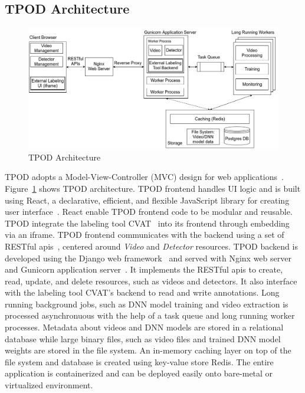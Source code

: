 \subsection{TPOD Architecture}

\begin{figure}[]
  \hspace{-.1in}
    \includegraphics[width=1.1\textwidth]{FIGS/tpod-arch}
    \caption{TPOD Architecture}
  \label{figs:tpod-arch}
\end{figure}

TPOD adopts a Model-View-Controller (MVC) design for web
applications~\cite{krasner1988description}. Figure~\ref{figs:tpod-arch} shows
TPOD architecture. TPOD frontend handles UI logic and is built using React, a
declarative, efficient, and flexible JavaScript library for creating user
interface~\cite{staff2016react}. React enable TPOD frontend code to be modular
and reusable. TPOD integrate the labeling tool CVAT~\cite{cvat2019} into its
frontend through embedding via an iframe. TPOD frontend communicates with the
backend using a set of RESTful apis~\cite{richardson2008restful}, centered
around \textit{Video} and \textit{Detector} resources. TPOD backend is developed
using the Django web framework~\cite{holovaty2009definitive} and served with
Nginx web server~\cite{nedelcu2010nginx} and Gunicorn application
server~\cite{gunicorn2017http}. It implements the RESTful apis to create, read,
update, and delete resources, such as videos and detectors. It also interface
with the labeling tool CVAT's backend to read and write annotations. Long
running background jobs, such as DNN model training and video extraction is
processed asynchronuous with the help of a task queue and long running worker
processes. Metadata about videos and DNN models are stored in a relational
database while large binary files, such as video files and trained DNN model
weights are stored in the file system. An in-memory caching layer on top of the
file system and database is created using key-value store Redis. The entire
application is containerized and can be deployed easily onto bare-metal or
virtualized environment.

